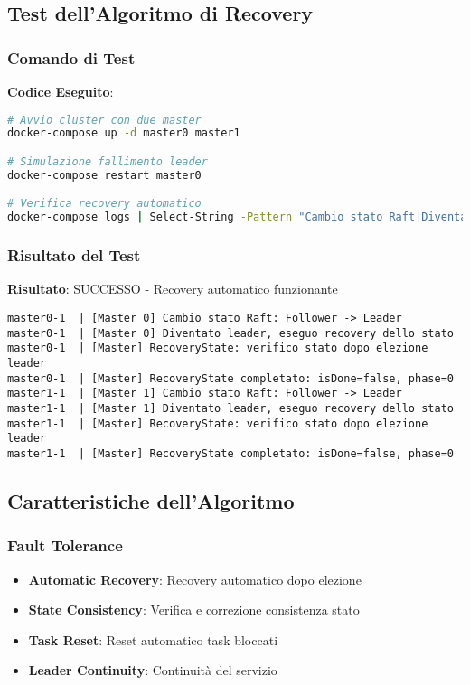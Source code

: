 \documentclass[12pt,a4paper]{article}
\begin{document}
\subsection{Test dell'Algoritmo di Recovery}

\subsubsection{Comando di Test}

\textbf{Codice Eseguito}:
\begin{lstlisting}[language=bash]
# Avvio cluster con due master
docker-compose up -d master0 master1

# Simulazione fallimento leader
docker-compose restart master0

# Verifica recovery automatico
docker-compose logs | Select-String -Pattern "Cambio stato Raft|Diventato leader|RecoveryState"
\end{lstlisting}

\subsubsection{Risultato del Test}

\textbf{Risultato}: SUCCESSO - Recovery automatico funzionante
\begin{lstlisting}
master0-1  | [Master 0] Cambio stato Raft: Follower -> Leader
master0-1  | [Master 0] Diventato leader, eseguo recovery dello stato
master0-1  | [Master] RecoveryState: verifico stato dopo elezione leader        
master0-1  | [Master] RecoveryState completato: isDone=false, phase=0
master1-1  | [Master 1] Cambio stato Raft: Follower -> Leader
master1-1  | [Master 1] Diventato leader, eseguo recovery dello stato
master1-1  | [Master] RecoveryState: verifico stato dopo elezione leader        
master1-1  | [Master] RecoveryState completato: isDone=false, phase=0
\end{lstlisting}

\subsection{Caratteristiche dell'Algoritmo}

\subsubsection{Fault Tolerance}

\begin{itemize}
\item \textbf{Automatic Recovery}: Recovery automatico dopo elezione
\item \textbf{State Consistency}: Verifica e correzione consistenza stato
\item \textbf{Task Reset}: Reset automatico task bloccati
\item \textbf{Leader Continuity}: Continuità del servizio
\end{itemize}
\end{document}

